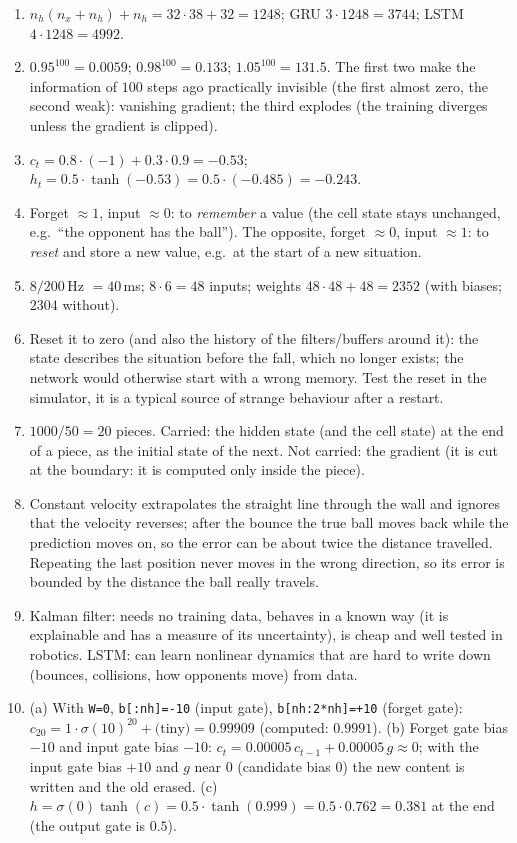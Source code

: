\begin{enumerate}[label=\textbf{\ansnum.\arabic*}]
  \item $n_h(n_x+n_h)+n_h=32\cdot38+32=1248$; GRU $3\cdot1248=3744$; LSTM $4\cdot1248=4992$.
  \item $0.95^{100}=0.0059$; $0.98^{100}=0.133$; $1.05^{100}=131.5$. The first two make the information of $100$ steps ago practically invisible (the first almost zero, the second weak): vanishing gradient; the third explodes (the training diverges unless the gradient is clipped).
  \item $c_t=0.8\cdot(-1)+0.3\cdot0.9=-0.53$; $h_t=0.5\cdot\tanh(-0.53)=0.5\cdot(-0.485)=-0.243$.
  \item Forget $\approx1$, input $\approx0$: to \emph{remember} a value (the cell state stays unchanged, e.g.\ ``the opponent has the ball''). The opposite, forget $\approx0$, input $\approx1$: to \emph{reset} and store a new value, e.g.\ at the start of a new situation.
  \item $8/200$\,Hz $=40$\,ms; $8\cdot6=48$ inputs; weights $48\cdot48+48=2352$ (with biases; $2304$ without).
  \item Reset it to zero (and also the history of the filters/buffers around it): the state describes the situation before the fall, which no longer exists; the network would otherwise start with a wrong memory. Test the reset in the simulator, it is a typical source of strange behaviour after a restart.
  \item $1000/50=20$ pieces. Carried: the hidden state (and the cell state) at the end of a piece, as the initial state of the next. Not carried: the gradient (it is cut at the boundary: it is computed only inside the piece).
  \item Constant velocity extrapolates the straight line through the wall and ignores that the velocity reverses; after the bounce the true ball moves back while the prediction moves on, so the error can be about twice the distance travelled. Repeating the last position never moves in the wrong direction, so its error is bounded by the distance the ball really travels.
  \item Kalman filter: needs no training data, behaves in a known way (it is explainable and has a measure of its uncertainty), is cheap and well tested in robotics. LSTM: can learn nonlinear dynamics that are hard to write down (bounces, collisions, how opponents move) from data.
  \item[\textbf{\ansnum.10}] (a) With \texttt{W=0}, \texttt{b[:nh]=-10} (input gate), \texttt{b[nh:2*nh]=+10} (forget gate): $c_{20}=1\cdot\sigma(10)^{20}+\text{(tiny)}=0.99909$ (computed: $0.9991$). (b) Forget gate bias $-10$ and input gate bias $-10$: $c_t=0.00005\,c_{t-1}+0.00005\,g\approx0$; with the input gate bias $+10$ and $g$ near $0$ (candidate bias $0$) the new content is written and the old erased. (c) $h=\sigma(0)\tanh(c)=0.5\cdot\tanh(0.999)=0.5\cdot0.762=0.381$ at the end (the output gate is $0.5$).

\end{enumerate}
